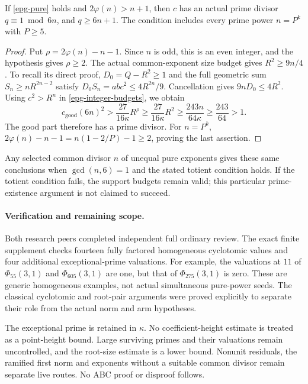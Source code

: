 \begin{corollary}
\label{epg-prime-exists}
If \eqref{epg-pure} holds and $2\varphi(n)>n+1$, then $c$ has
an actual prime divisor $q\equiv1\bmod6n$, and $q\ge6n+1$.
The condition includes every prime power $n=P^k$ with $P\ge5$.
\end{corollary}
\begin{proof}
Put $\rho=2\varphi(n)-n-1$. Since $n$ is odd, this is an even
integer, and the hypothesis gives $\rho\ge2$.
The actual common-exponent size budget gives $R^2\ge9n/4$.
To recall its direct proof, $D_0=Q-R^2\ge1$ and the full geometric
sum $S_n\ge nR^{2n-2}$ satisfy
$D_0S_n=ab c^2\le4R^{2n}/9$.
Cancellation gives $9nD_0\le4R^2$.
Using $c^2>R^n$ in \eqref{epg-integer-budgets}, we obtain
\[
 c_{\mathrm{good}}(6n)^2
 >\frac{27}{16\kappa}R^\rho
 \ge\frac{27}{16\kappa}R^2
 \ge\frac{243n}{64\kappa}
 \ge\frac{243}{64}>1.
\]
The good part therefore has a prime divisor. For $n=P^k$,
$2\varphi(n)-n-1=n(1-2/P)-1\ge2$, proving the last assertion.
\end{proof}

Any selected common divisor $n$ of unequal pure exponents gives
these same conclusions when $\gcd(n,6)=1$ and the stated totient
condition holds. If the totient condition fails, the support budgets
remain valid; this particular prime-existence argument is not claimed
to succeed.

\paragraph{Verification and remaining scope.}
Both research peers completed independent full ordinary review.
The exact finite supplement checks fourteen fully factored homogeneous
cyclotomic values and four additional exceptional-prime valuations.
For example, the valuations at $11$ of
$\Phi_{55}(3,1)$ and $\Phi_{605}(3,1)$ are one, but that of
$\Phi_{275}(3,1)$ is zero. These are generic homogeneous examples,
not actual simultaneous pure-power seeds.
The classical cyclotomic and root-pair arguments were proved explicitly
to separate their role from the actual norm and arm hypotheses.

The exceptional prime is retained in $\kappa$. No coefficient-height
estimate is treated as a point-height bound. Large surviving primes
and their valuations remain uncontrolled, and the root-size estimate
is a lower bound. Nonunit residuals, the ramified first norm and
exponents without a suitable common divisor remain separate live
routes. No ABC proof or disproof follows.
